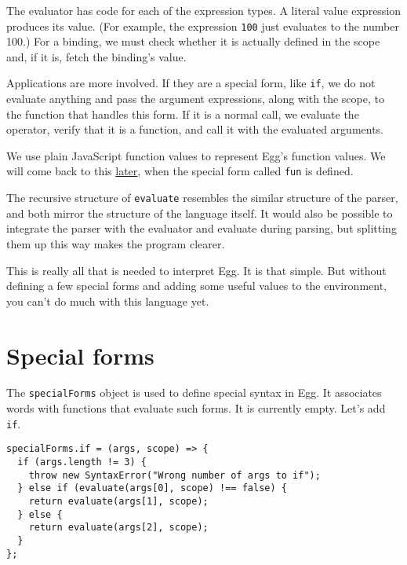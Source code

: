 The evaluator has code for each of the expression types. A literal value expression produces its value. (For example, the expression \lstinline`100` just evaluates to the number 100.) For a binding, we must check whether it is actually defined in the scope and, if it is, fetch the binding's value.

Applications are more involved. If they are a special form, like \lstinline`if`, we do not evaluate anything and pass the argument expressions, along with the scope, to the function that handles this form. If it is a normal call, we evaluate the operator, verify that it is a function, and call it with the evaluated arguments.

We use plain JavaScript function values to represent Egg's function values. We will come back to this \hyperref[language.egg_fun]{later}, when the special form called \lstinline`fun` is defined.

The recursive structure of \lstinline`evaluate` resembles the similar structure of the parser, and both mirror the structure of the language itself. It would also be possible to integrate the parser with the evaluator and evaluate during parsing, but splitting them up this way makes the program clearer.

This is really all that is needed to interpret Egg. It is that simple. But without defining a few special forms and adding some useful values to the environment, you can't do much with this language yet.

\section{Special forms}

The \lstinline`specialForms` object is used to define special syntax in Egg. It associates words with functions that evaluate such forms. It is currently empty. Let's add \lstinline`if`.

\begin{lstlisting}
specialForms.if = (args, scope) => {
  if (args.length != 3) {
    throw new SyntaxError("Wrong number of args to if");
  } else if (evaluate(args[0], scope) !== false) {
    return evaluate(args[1], scope);
  } else {
    return evaluate(args[2], scope);
  }
};
\end{lstlisting}
\noindent{}


